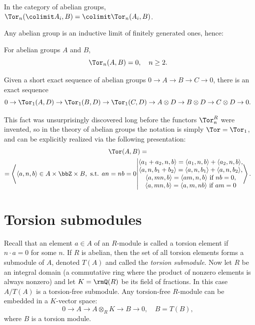 \begin{thm} In the category of abelian groups,
    $\Tor_n(\colimit A_i,B)=\colimit \Tor_n(A_i,B)$.
\end{thm}
Any abelian group is an inductive limit of finitely generated ones, hence:
\begin{cor}
    For abelian groups $A$ and $B$,
    \[\Tor_n(A,B)=0,\quad n\geq 2.\]
\end{cor}
\begin{cor}
    Given a short exact sequence of abelian groups $0\to A\to B\to C\to 0$, there is an exact sequence
    \[0\to\Tor_1(A,D)\to \Tor_1(B,D)\to \Tor_1(C,D)\to A\otimes D\to B\otimes D\to C\otimes D\to 0.\]
\end{cor}

This fact was unsurprisingly discovered long before the functors $\Tor_n^R$ were invented, so in the theory of abelian groups the notation is simply $\Tor=\Tor_1$, and can be explicitly realized via the following presentation:
\begin{multline}
    \Tor(A,B)=\\
    =\left\langle \langle a,n,b\rangle\in A\times \bbZ\times B,\text{ s.t. } an=nb=0 
    \middle|
    \begin{matrix}
    \langle a_1+a_2,n,b\rangle= \langle a_1,n,b\rangle+\langle a_2,n,b\rangle,\\
    \langle a,n,b_1+b_2\rangle=\langle a,n,b_1\rangle+\langle a,n,b_2\rangle,\\
    \langle a,mn,b\rangle=\langle am,n,b\rangle \text{ if }nb=0,\\
    \langle a,mn,b\rangle=\langle a,m,nb\rangle \text{ if }am=0
    \end{matrix}
    \right\rangle.
\end{multline}




\section{Torsion submodules}

Recall that an element $a\in A$ of an $R$-module is called a torsion element if $n\cdot a=0$ for some $n$. If $R$ is abelian, then the set of all torsion elements forms a submodule of $A$, denoted $T(A)$ and called the \emph{torsion submodule}. Now let $R$ be an integral domain (a commutative ring where the product of nonzero elements is always nonzero) and let $K=\rmQ(R)$ be its field of fractions. In this case $A\slash T(A)$ is a torsion-free submodule. Any torsion-free $R$-module can be embedded in a $K$-vector space:
\[0\to A\to A\otimes_R K\to B\to 0,\quad B=T(B),\]
where $B$ is a torsion module.

